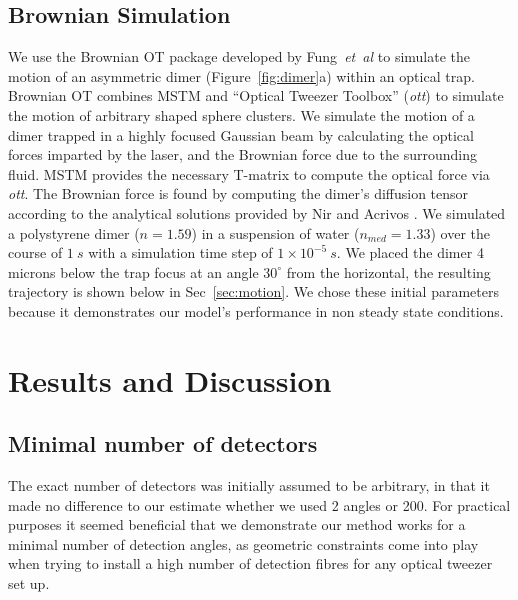 \documentclass[12pt]{spieman}
\begin{document}
\begin{spacing}{1.5}
\subsection{Brownian Simulation}
\label{sec:brownian}

We use the Brownian OT package developed by Fung~\textit{et~al} \cite{Vigilante2020Brownian_OT} to simulate the motion of an asymmetric dimer (Figure~\ref{fig:dimer}a) within an optical trap. Brownian OT combines MSTM \cite{Mishchenko1996MSTM} and ``Optical Tweezer Toolbox'' (\textit{ott}) \cite{Lenton2020} to simulate the motion of arbitrary
shaped sphere clusters. We simulate the motion of a dimer trapped in a highly focused Gaussian beam by calculating the optical forces imparted by the laser, and the Brownian force due to the surrounding fluid. MSTM provides the necessary T-matrix to compute the optical force via \textit{ott}. The Brownian force is found by computing the dimer's diffusion tensor according to the analytical solutions provided by Nir and Acrivos \cite{nir_acrivos_1973}. We simulated a polystyrene dimer ($n = 1.59$) in a suspension of water ($n_{med} = 1.33$) over the course of $1 \ s$ with a simulation time step of $1 \times 10^{-5} \ s$. We placed the dimer 4 microns below the trap focus at an angle $30^{\circ}$ from the horizontal, the resulting trajectory is shown below in Sec~\ref{sec:motion}. We chose these initial parameters because it demonstrates our model's performance in non steady state conditions. 

\section{Results and  Discussion}
\label{sec:Discussion}
\subsection{Minimal number of detectors}
\label{sec:detectors}
The exact number of detectors was initially assumed to be arbitrary, in that it made no difference to our estimate whether we used 2 angles or 200. For practical purposes it seemed beneficial that we demonstrate our method works for a minimal number of detection angles, as geometric constraints come into play when trying to install a high number of detection fibres for any optical tweezer set up. 



\end{spacing}
\end{document}
